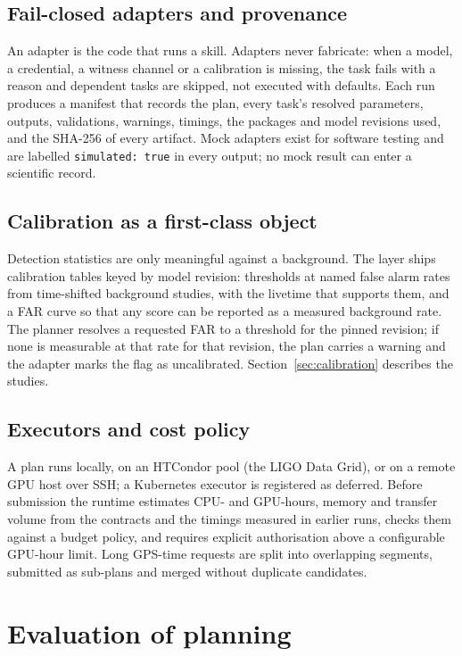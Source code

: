 \documentclass[twocolumn]{aastex631}
\begin{document}
\subsection{Fail-closed adapters and provenance}
\label{sec:adapters}
An adapter is the code that runs a skill. Adapters never fabricate: when a
model, a credential, a witness channel or a calibration is missing, the
task fails with a reason and dependent tasks are skipped, not executed with
defaults. Each run produces a manifest that records the plan, every task's
resolved parameters, outputs, validations, warnings, timings, the packages
and model revisions used, and the SHA-256 of every artifact. Mock adapters
exist for software testing and are labelled \texttt{simulated: true} in every
output; no mock result can enter a scientific record.

\subsection{Calibration as a first-class object}
\label{sec:calib}
Detection statistics are only meaningful against a background. The layer
ships calibration tables keyed by model revision: thresholds at named false
alarm rates from time-shifted background studies, with the livetime that
supports them, and a FAR curve so that any score can be reported as a
measured background rate. The planner resolves a requested FAR to a
threshold for the pinned revision; if none is measurable at that rate for
that revision, the plan carries a warning and the adapter marks the flag as
uncalibrated. Section~\ref{sec:calibration} describes the studies.

\subsection{Executors and cost policy}
\label{sec:executors}
A plan runs locally, on an HTCondor pool (the LIGO Data Grid), or on a
remote GPU host over SSH; a Kubernetes executor is registered as deferred.
Before submission the runtime estimates CPU- and GPU-hours, memory and
transfer volume from the contracts and the timings measured in earlier
runs, checks them against a budget policy, and requires explicit
authorisation above a configurable GPU-hour limit. Long GPS-time requests
are split into overlapping segments, submitted as sub-plans and merged
without duplicate candidates.

\section{Evaluation of planning}
\label{sec:planning}
\end{document}
